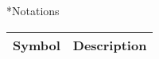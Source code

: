 
\renewcommand{\div}{\mathrm{div}}
\newcommand{\norm}[1]{\left\lVert #1 \right\rVert}
\newcommand{\parent}[1]{\left( #1 \right)}
\newcommand{\cparent}[1]{\left\{ #1 \right\}}
\newcommand{\setsuchthat}{\ \mid|\ }


\theoremstyle{definition}
\newtheorem{proposition}{Proposition}
\newtheorem{lemme}{Lemme}
\newtheorem{remarque}{Remarque}

\newcommand{\temperature}{\Theta}
\newcommand{\concentration}{c}
\newcommand{\enthalpy}


\chapter*{Notations}

\begin{tabularx}{\textwidth}{@{}ll@{}}
  \toprule
  Symbol & Description \\
  \midrule

  \bottomrule
\end{tabularx}
